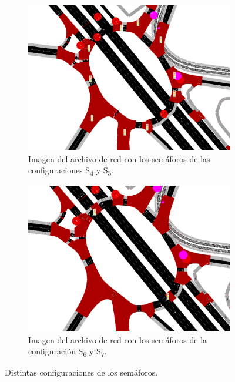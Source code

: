 \begin{figure}[!t]
    \centering
    \begin{subfigure}[t]{0.48\textwidth}
        \centering
        \includegraphics[width=\textwidth]{report/images/conf2.png}
        \caption{Imagen del archivo de red con los semáforos de las configuraciones S\textsubscript{4} y S\textsubscript{5}.}
        \label{fig:conf2}
    \end{subfigure}
    \hfill
    \begin{subfigure}[t]{0.48\textwidth}
        \centering
        \includegraphics[width=\textwidth]{report/images/conf3.png}
        \caption{Imagen del archivo de red con los semáforos de la configuración S\textsubscript{6} y S\textsubscript{7}.}
        \label{fig:conf3}
    \end{subfigure}
    \caption{Distintas configuraciones de los semáforos.}
    \label{fig:confs}
\end{figure}




